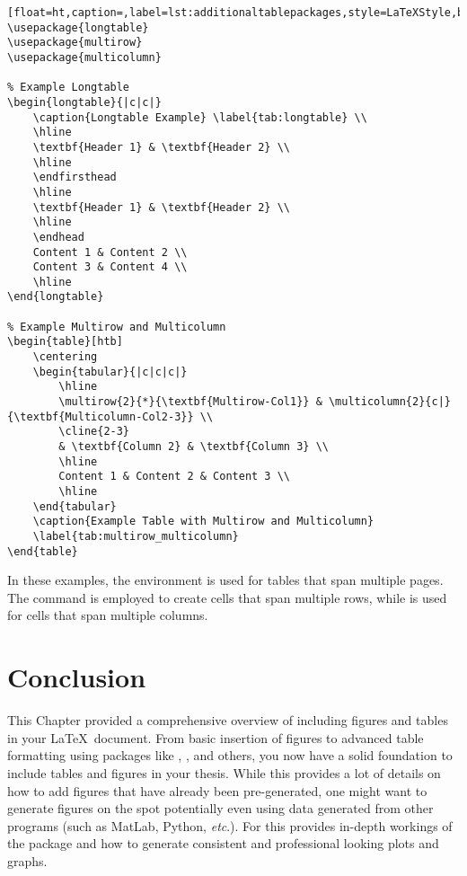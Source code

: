 		\begin{lstlisting}[float=ht,caption=,label=lst:additionaltablepackages,style=LaTeXStyle,basicstyle=\small\ttfamily,]
\usepackage{longtable}
\usepackage{multirow}
\usepackage{multicolumn}

% Example Longtable
\begin{longtable}{|c|c|}
	\caption{Longtable Example} \label{tab:longtable} \\
	\hline
	\textbf{Header 1} & \textbf{Header 2} \\
	\hline
	\endfirsthead
	\hline
	\textbf{Header 1} & \textbf{Header 2} \\
	\hline
	\endhead
	Content 1 & Content 2 \\
	Content 3 & Content 4 \\
	\hline
\end{longtable}

% Example Multirow and Multicolumn
\begin{table}[htb]
	\centering
	\begin{tabular}{|c|c|c|}
		\hline
		\multirow{2}{*}{\textbf{Multirow-Col1}} & \multicolumn{2}{c|}{\textbf{Multicolumn-Col2-3}} \\
		\cline{2-3}
		& \textbf{Column 2} & \textbf{Column 3} \\
		\hline
		Content 1 & Content 2 & Content 3 \\
		\hline
	\end{tabular}
	\caption{Example Table with Multirow and Multicolumn}
	\label{tab:multirow_multicolumn}
\end{table}
		\end{lstlisting}

		In these examples, the  environment is used for tables that span multiple pages. 
		The  command is employed to create cells that span multiple rows, while  is used for cells that span multiple columns.

	\section{Conclusion}
		This Chapter provided a comprehensive overview of including figures and tables in your \LaTeX\ document. 
		From basic insertion of figures to advanced table formatting using packages like , , and others, you now have a solid foundation to include tables and figures in your thesis.
		While this provides a lot of details on how to add figures that have already been pre-generated, one might want to generate figures on the spot potentially even using data generated from other programs (such as MatLab\textsuperscript{\tiny\textregistered}, Python, \textit{etc}.).
		For this  provides in-depth workings of the  package and how to generate consistent and professional looking plots and graphs.